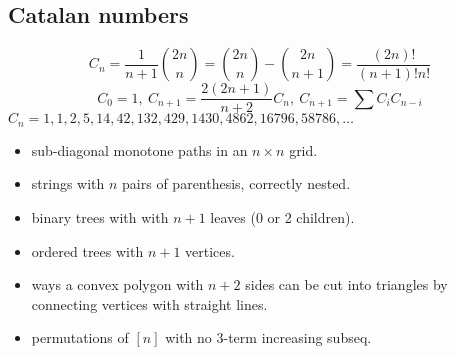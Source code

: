 \subsection{Catalan numbers}
\[ C_n=\frac{1}{n+1}\binom{2n}{n}= \binom{2n}{n}-\binom{2n}{n+1} = \frac{(2n)!}{(n+1)!n!} \]
\[ C_0=1,\ C_{n+1} = \frac{2(2n+1)}{n+2}C_n,\ C_{n+1}=\sum C_iC_{n-i} \]
${C_n = 1, 1, 2, 5, 14, 42, 132, 429, 1430, 4862, 16796, 58786, \dots}$
\begin{itemize}
   \item sub-diagonal monotone paths in an $n\times n$ grid.
   \item strings with $n$ pairs of parenthesis, correctly nested.
   \item binary trees with with $n+1$ leaves (0 or 2 children).
   \item ordered trees with $n+1$ vertices.
   \item ways a convex polygon with $n+2$ sides can be cut into triangles by connecting
         vertices with straight lines.
   \item permutations of $[n]$ with no 3-term increasing subseq.
\end{itemize}
